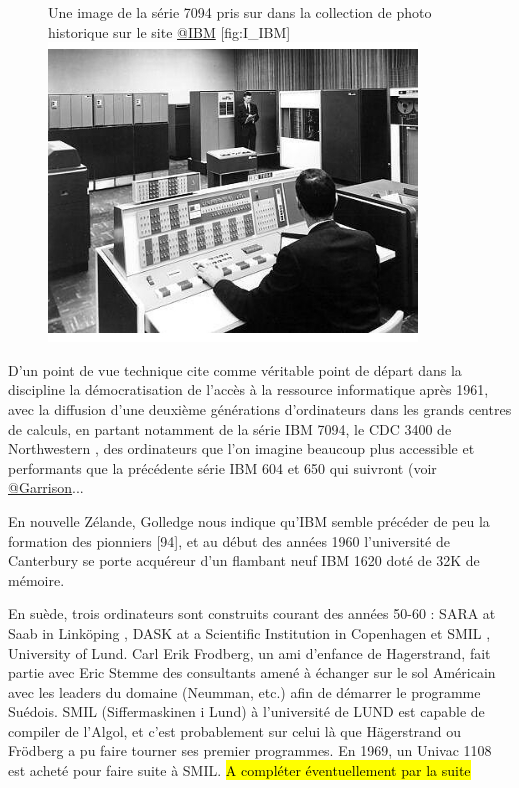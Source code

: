 \begin{figure}[h]
\begin{sidecaption}[fortoc]{Une image de la série 7094 pris sur dans la collection de photo historique sur le site \href{http://www-03.ibm.com/ibm/history/exhibits/mainframe/mainframe_album.html}{@IBM} }[fig:I_IBM]
  \centering
 \includegraphics[width=.8\linewidth]{IBM7094.jpg}
  \end{sidecaption}
\end{figure}

D'un point de vue technique \textcite{Haggett1969} cite comme véritable point de départ dans la discipline la  démocratisation de l'accès à la ressource informatique après 1961, avec la diffusion d'une deuxième générations d'ordinateurs dans les grands centres de calculs, en partant notamment de la série IBM 7094, le CDC 3400 de Northwestern \autocite[3]{Marble1967}, des ordinateurs que l'on imagine beaucoup plus accessible et performants que la précédente série IBM 604 et 650 qui suivront (voir \href{http://www.aag.org/cs/garrison}{@Garrison}...

En nouvelle Zélande, Golledge nous indique qu'IBM semble précéder de peu la formation des pionniers [94]\autocite{Bailly2000}, et au début des années 1960 l'université de Canterbury se porte acquéreur d'un flambant neuf IBM 1620 doté de 32K de mémoire.

En suède, trois ordinateurs sont construits courant des années 50-60 :  SARA at Saab in Linköping , DASK at a Scientific Institution in Copenhagen et SMIL , University of Lund. \autocite{Persson} Carl Erik Frodberg, un ami d'enfance de Hagerstrand, fait partie avec Eric Stemme des consultants amené à échanger sur le sol Américain avec les leaders du domaine (Neumman, etc.) afin de démarrer le programme Suédois. SMIL (Siffermaskinen i Lund) à l'université de LUND est capable de compiler de l'Algol, et c'est probablement sur celui là que Hägerstrand ou Frödberg a pu faire tourner ses premier programmes. En 1969, un Univac 1108 est acheté pour faire suite à SMIL. \hl{A compléter éventuellement par la suite}

